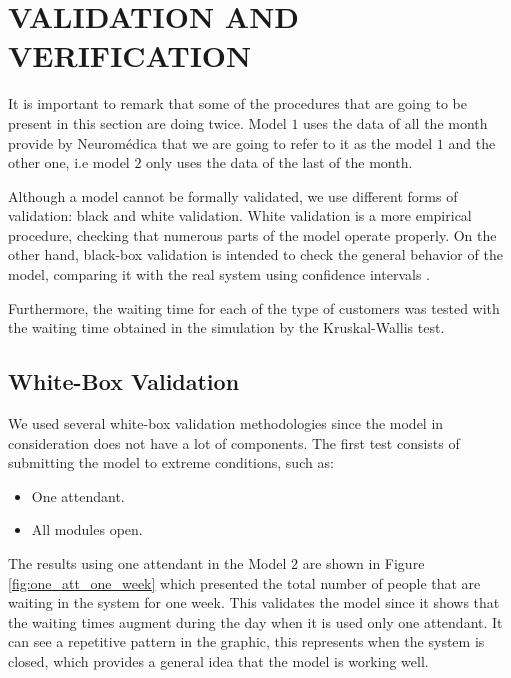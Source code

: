 \section{VALIDATION AND VERIFICATION}\label{sec:valid}
It is important to remark that some of the procedures that are going to be present in this section are doing twice. Model $1$ uses the data of all the month provide by Neuromédica that we are going to refer to it as the model $1$ and the other one, i.e model $2$ only uses the data of the last of the month.

Although a model cannot be formally validated, we use different forms of validation: black and white validation. White validation is a more empirical procedure, checking that numerous parts of the model operate properly.  On the other hand, black-box validation is intended to check the general behavior of the model, comparing it with the real system using confidence intervals \cite[Ch. 12]{robinson2004simulation}. 

Furthermore, the waiting time for each of the type of customers was tested with the waiting time obtained in the simulation by the Kruskal-Wallis test.

\subsection{White-Box Validation}
We used several white-box validation methodologies since the model in consideration does not have a lot of components. The first test consists of submitting the model to extreme conditions, such as:
\begin{itemize}
\item One attendant.
\item All modules open.
\end{itemize}


The results using one attendant in the Model $2$ are shown in Figure \ref{fig:one_att_one_week} which presented the total number of people that are waiting in the system for one week. This validates the model since it shows that the waiting times augment during the day when it is used only one attendant.  It can see a repetitive pattern in the graphic, this represents when the system is closed, which provides a general idea that the model is working well.


